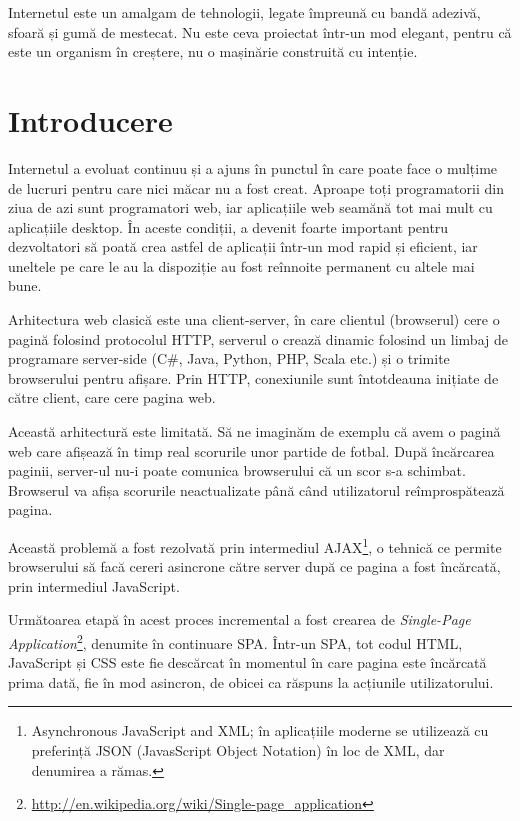 \begin{savequote}[75mm]
Internetul este un amalgam de tehnologii, legate împreună cu bandă adezivă,
sfoară și gumă de mestecat. Nu este ceva proiectat într-un mod elegant,
pentru că este un organism în creștere, nu o mașinărie construită
cu intenție.
\end{savequote}

\chapter{Introducere}

Internetul a evoluat continuu și a ajuns în punctul în care poate face o mulțime
de lucruri pentru care nici măcar nu a fost creat. Aproape toți programatorii din
ziua de azi sunt programatori web, iar aplicațiile web seamănă tot mai mult cu 
aplicațiile desktop. În aceste condiții, a devenit foarte important pentru
dezvoltatori să poată crea astfel de aplicații într-un mod rapid și eficient, 
iar uneltele pe care le au la dispoziție au fost reînnoite permanent cu altele
mai bune.

Arhitectura web clasică este una client-server, în care clientul (browserul)
cere o pagină folosind protocolul HTTP, serverul o crează dinamic folosind un 
limbaj de programare server-side (C\#, Java, Python, PHP, Scala etc.) și o trimite 
browserului pentru afișare. Prin HTTP, conexiunile sunt întotdeauna inițiate 
de către client, care cere pagina web.

Această arhitectură este limitată. Să ne imaginăm de exemplu că avem o pagină
web care afișează în timp real scorurile unor partide de fotbal. După încărcarea
paginii, server-ul nu-i poate comunica browserului că un scor s-a schimbat.
Browserul va afișa scorurile neactualizate până când utilizatorul reîmprospătează
pagina.

Această problemă a fost rezolvată prin intermediul
AJAX\footnote{Asynchronous JavaScript and XML; în aplicațiile moderne
se utilizează cu preferință JSON (JavasScript Object Notation) în loc de XML,
dar denumirea a rămas.},
o tehnică ce permite browserului să facă cereri asincrone către server după ce 
pagina a fost încărcată, prin intermediul JavaScript.

Următoarea etapă în acest proces incremental a fost crearea de 
\emph{Single-Page Application}\footnote{\url{http://en.wikipedia.org/wiki/Single-page\_application}},
denumite în continuare SPA. Într-un SPA, tot codul HTML, JavaScript și CSS este
fie descărcat în momentul în care pagina este încărcată prima dată, fie în mod asincron, de obicei ca
răspuns la acțiunile utilizatorului.

